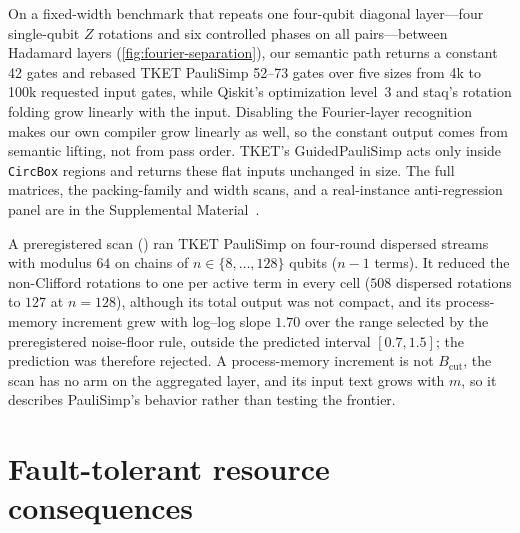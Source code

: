 \documentclass[aps,prx,reprint,superscriptaddress,floatfix,longbibliography]{revtex4-2}
\begin{document}
On a fixed-width benchmark that repeats one four-qubit diagonal
layer---four single-qubit $Z$ rotations and six controlled phases on all
pairs---between Hadamard layers (\cref{fig:fourier-separation}), our
semantic path returns a constant 42 gates and rebased TKET PauliSimp 52--73
gates over five sizes from 4k to 100k requested input gates, while Qiskit's
optimization level~3 and staq's rotation folding grow linearly with the
input.  Disabling the Fourier-layer recognition makes our own compiler
grow linearly as well, so the constant output comes from semantic lifting,
not from pass order.  TKET's GuidedPauliSimp acts only inside
\texttt{CircBox} regions and returns these flat inputs unchanged in size.
The full matrices, the packing-family and width scans, and a
real-instance anti-regression panel are in the Supplemental
Material~\cite{supplement}.

A preregistered scan ()
ran TKET PauliSimp on four-round dispersed streams with modulus $64$ on
chains of $n\in\{8,\ldots,128\}$ qubits ($n-1$ terms).  It reduced the
non-Clifford rotations to one per active term in every cell ($508$
dispersed rotations to $127$ at $n=128$), although its total output was not
compact, and its process-memory increment grew with log--log slope
$1.70$ over the range selected by the preregistered noise-floor rule,
outside the predicted interval $[0.7,1.5]$; the prediction was therefore
rejected.  A process-memory increment is not $B_{\mathrm{cut}}$, the scan
has no arm on the aggregated layer, and its input text grows with $m$, so
it describes PauliSimp's behavior rather than testing the frontier.

\section{Fault-tolerant resource consequences}
\label{sec:ft-consequences}
\end{document}
